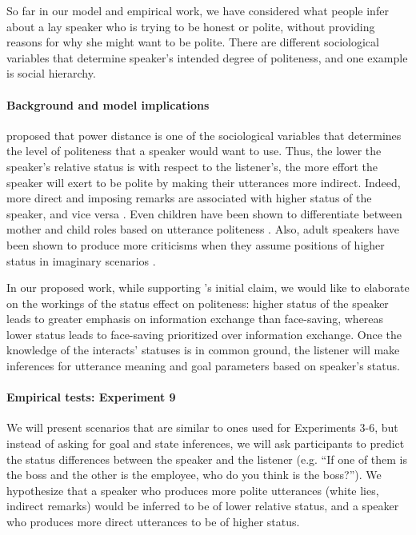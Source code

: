 So far in our model and empirical work, we have considered what people infer about a lay speaker who is trying to be honest or polite, without providing reasons for why she might want to be polite. There are different sociological variables that determine speaker's intended degree of politeness, and one example is social hierarchy. 

\paragraph{Background and model implications} \citet{Brown1987} proposed that power distance is one of the sociological variables that determines the level of politeness that a speaker would want to use. Thus, the lower the speaker's relative status is with respect to the listener's, the more effort the speaker will exert to be polite by making their utterances more indirect. Indeed, more direct and imposing remarks are associated with higher status of the speaker, and vice versa \citep{holtgraves1986, holtgraves1990, leichty1991}. Even children have  been shown to differentiate between mother and child roles based on utterance politeness \citep{axia1985}. Also, adult speakers have been shown to produce more criticisms when they assume positions of higher status in imaginary scenarios \citep{lim1991}. 

In our proposed work, while supporting \citet{Brown1987}'s initial claim, we would like to elaborate on the workings of the status effect on politeness: 
higher status of the speaker leads to greater emphasis on information exchange than face-saving, 
whereas lower status leads to face-saving prioritized over information exchange. 
Once the knowledge of the interacts' statuses is in common ground, 
the listener will make inferences for utterance meaning and goal parameters based on speaker's status.

\paragraph{Empirical tests: Experiment 9} We will present scenarios that are similar to ones used for Experiments 3-6, but instead of asking for goal and state inferences, we will ask participants to predict the status differences between the speaker and the listener (e.g. ``If one of them is the boss and the other is the employee, who do you think is the boss?''). We hypothesize that a speaker who produces more polite utterances (white lies, indirect remarks) would be inferred to be of lower relative status, and a speaker who produces more direct utterances to be of higher status. 


